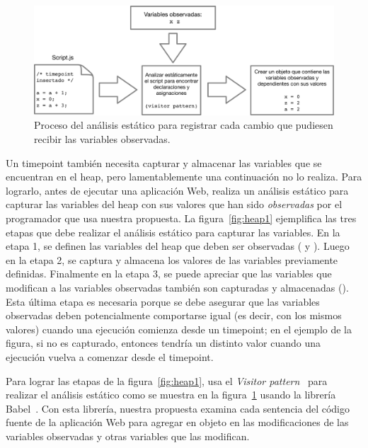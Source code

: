 \documentclass[conference]{IEEEtran}
\begin{document}
\begin{figure}[t]
\begin{center}
\includegraphics[width=.95\linewidth]{fig-heap2}
\caption{Proceso del an\'alisis est\'atico para registrar cada cambio que pudiesen recibir las variables observadas.}
\label{fig:heap2}
\end{center}
\end{figure}

Un timepoint tambi\'en necesita capturar y almacenar las variables que se encuentran en el heap, pero lamentablemente una continuaci\'on no lo realiza. Para lograrlo, antes de ejecutar una aplicaci\'on Web, \deloreanjs realiza un an\'alisis est\'atico para capturar las variables del heap con sus valores que han sido {\em observadas} por el programador que usa nuestra propuesta. La figura~\ref{fig:heap1} ejemplifica las tres etapas que debe realizar el an\'alisis est\'atico para capturar las variables. En la etapa 1, se definen las variables del heap que deben ser observadas ( y ). Luego en la etapa 2, se captura y almacena los valores de las variables previamente definidas. Finalmente en la etapa 3, se puede apreciar que las variables que modifican a las variables observadas tambi\'en son capturadas y almacenadas (). Esta \'ultima etapa es necesaria porque se debe asegurar que las variables observadas deben potencialmente comportarse igual (es decir, con los mismos valores) cuando una ejecuci\'on comienza desde un timepoint; en el ejemplo de la figura, si  no es capturado, entonces  tendr\'ia un distinto valor cuando una ejecuci\'on vuelva a comenzar desde el timepoint.          

Para lograr las etapas de la figura~\ref{fig:heap1}, \deloreanjs usa el {\em Visitor pattern}~\cite{GoF94} para realizar el an\'alisis est\'atico como se muestra en la figura~\ref{fig:heap2} usando la librer\'ia Babel~\cite{mckenzie:babel}. Con esta librer\'ia, nuestra propuesta examina cada sentencia del c\'odigo fuente de la aplicaci\'on Web para agregar en objeto en \javascript las modificaciones de las variables observadas y otras variables que las modifican.
\end{document}
